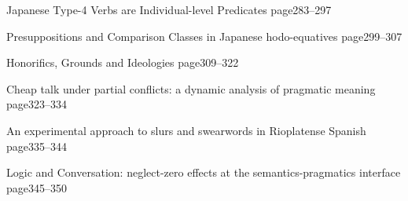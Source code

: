 \documentclass[12pt]{jarticle}
\begin{document}
     {Japanese Type-4 Verbs are Individual-level Predicates}
     {page283--297}
  
     {Presuppositions and Comparison Classes in Japanese hodo-equatives}
     {page299--307}




  
     {Honorifics, Grounds and Ideologies}
     {page309--322}
  
     {Cheap talk under partial conflicts: a dynamic analysis of pragmatic meaning}
     {page323--334}
  
     {An experimental approach to slurs and swearwords in Rioplatense Spanish}
     {page335--344}




  
     {Logic and Conversation: neglect-zero effects at the semantics-pragmatics interface}
     {page345--350}







  
\end{document}
